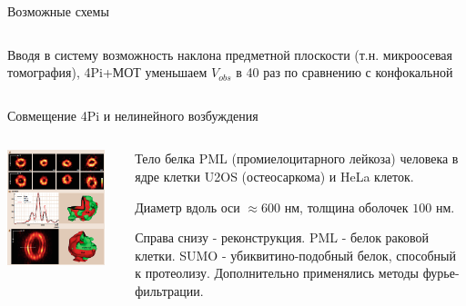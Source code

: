 \documentclass[9pt, compress, xcolor=table]{beamer}
\begin{document}
\begin{frame}{Возможные схемы}
\begin{columns}[c]
{\small Вводя в систему возможность наклона предметной плоскости (т.н. микроосевая томография), 4Pi+МОТ уменьшаем $V_{obs}$
в 40 раз по сравнению с конфокальной}
\end{columns}
\end{frame}

\begin{frame}{Совмещение 4Pi и нелинейного возбуждения}
\begin{columns}[c]
\column{8cm}
\begin{center}
\includegraphics[width=0.9\textwidth]{ffm08}
\end{center}
\column{4cm}
\begin{center}
{\small Тело белка PML (промиелоцитарного лейкоза) человека в ядре клетки U2OS (остеосаркома) и HeLa клеток. 

Диаметр вдоль оси $\approx 600$ нм, толщина оболочек $100$ нм.

Справа снизу - реконструкция. PML - белок раковой клетки. SUMO - убиквитино-подобный белок, способный к протеолизу. Дополнительно применялись методы фурье-фильтрации.}
\end{center}
\end{columns}
\end{frame}
\end{document}
